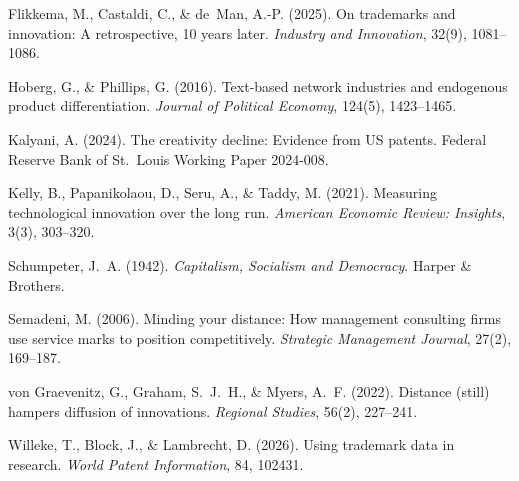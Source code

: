 Flikkema, M., Castaldi, C., \& de~Man, A.-P. (2025). On trademarks and
innovation: A retrospective, 10 years later. \emph{Industry and
Innovation}, 32(9), 1081--1086.

Hoberg, G., \& Phillips, G. (2016). Text-based network industries and
endogenous product differentiation. \emph{Journal of Political Economy},
124(5), 1423--1465.

Kalyani, A. (2024). The creativity decline: Evidence from US patents.
Federal Reserve Bank of St.\ Louis Working Paper 2024-008.

Kelly, B., Papanikolaou, D., Seru, A., \& Taddy, M. (2021). Measuring
technological innovation over the long run. \emph{American Economic
Review: Insights}, 3(3), 303--320.

Schumpeter, J.~A. (1942). \emph{Capitalism, Socialism and Democracy}.
Harper \& Brothers.

Semadeni, M. (2006). Minding your distance: How management consulting
firms use service marks to position competitively. \emph{Strategic
Management Journal}, 27(2), 169--187.

von Graevenitz, G., Graham, S.~J.~H., \& Myers, A.~F. (2022). Distance
(still) hampers diffusion of innovations. \emph{Regional Studies}, 56(2),
227--241.

Willeke, T., Block, J., \& Lambrecht, D. (2026). Using trademark data in
research. \emph{World Patent Information}, 84, 102431.
